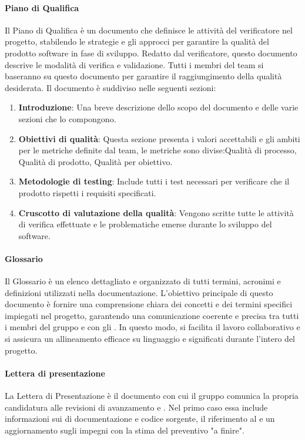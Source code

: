 \paragraph{Piano di Qualifica}
Il Piano di Qualifica è un documento che definisce le attività del verificatore nel progetto, stabilendo le strategie e gli approcci per garantire la qualità del prodotto software in fase di sviluppo. Redatto dal verificatore, questo documento descrive le modalità di verifica e validazione. Tutti i membri del team si baseranno su questo documento per garantire il raggiungimento della qualità desiderata.
Il documento è suddiviso nelle seguenti sezioni: 
\begin{enumerate}
    \item \textbf{Introduzione}: Una breve descrizione dello scopo del documento e delle varie sezioni che lo compongono.
    \item \textbf{Obiettivi di qualità}: Questa sezione presenta i valori accettabili e gli ambiti per le metriche definite dal team, le metriche sono divise:Qualità di processo, Qualità di prodotto, Qualità per obiettivo.
    \item \textbf{Metodologie di testing}: Include tutti i test necessari per verificare che il prodotto rispetti i requisiti specificati.
    \item \textbf{Cruscotto di valutazione della qualità}: Vengono scritte tutte le attività di verifica effettuate e le problematiche emerse durante lo sviluppo del software.
\end{enumerate}

\paragraph{Glossario}
Il Glossario è un elenco dettagliato e organizzato di tutti termini, acronimi e definizioni utilizzati nella documentazione. L’obiettivo principale di questo documento è fornire una comprensione chiara dei concetti e dei termini specifici impiegati nel progetto, garantendo una comunicazione coerente e precisa tra tutti i membri del gruppo e con gli . In questo modo, si facilita il lavoro collaborativo e si assicura un allineamento efficace su linguaggio e significati durante l'intero  del progetto.

\paragraph{Lettera di presentazione}
La Lettera di Presentazione è il documento con cui il gruppo comunica la propria candidatura alle revisioni di avanzamento  e . Nel primo caso essa include informazioni sui  di documentazione e codice sorgente, il riferimento al  e un aggiornamento sugli impegni con la stima del preventivo "a finire". 